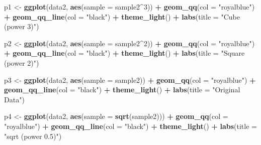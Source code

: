 \documentclass[
]{book}
\newenvironment{Shaded}{\begin{snugshade}}{\end{snugshade}}
\newcommand{\DataTypeTok}[1]{\textcolor[rgb]{0.13,0.29,0.53}{#1}}
\newcommand{\DecValTok}[1]{\textcolor[rgb]{0.00,0.00,0.81}{#1}}
\newcommand{\KeywordTok}[1]{\textcolor[rgb]{0.13,0.29,0.53}{\textbf{#1}}}
\newcommand{\NormalTok}[1]{#1}
\newcommand{\OperatorTok}[1]{\textcolor[rgb]{0.81,0.36,0.00}{\textbf{#1}}}
\newcommand{\StringTok}[1]{\textcolor[rgb]{0.31,0.60,0.02}{#1}}
\begin{document}
\begin{Shaded}
\begin{Highlighting}[]
\NormalTok{p1 <-}\StringTok{ }\KeywordTok{ggplot}\NormalTok{(data2, }\KeywordTok{aes}\NormalTok{(}\DataTypeTok{sample =}\NormalTok{ sample2}\OperatorTok{^}\DecValTok{3}\NormalTok{)) }\OperatorTok{+}
\StringTok{    }\KeywordTok{geom_qq}\NormalTok{(}\DataTypeTok{col =} \StringTok{"royalblue"}\NormalTok{) }\OperatorTok{+}\StringTok{ }
\StringTok{    }\KeywordTok{geom_qq_line}\NormalTok{(}\DataTypeTok{col =} \StringTok{"black"}\NormalTok{) }\OperatorTok{+}
\StringTok{    }\KeywordTok{theme_light}\NormalTok{() }\OperatorTok{+}
\StringTok{    }\KeywordTok{labs}\NormalTok{(}\DataTypeTok{title =} \StringTok{"Cube (power 3)"}\NormalTok{)}

\NormalTok{p2 <-}\StringTok{ }\KeywordTok{ggplot}\NormalTok{(data2, }\KeywordTok{aes}\NormalTok{(}\DataTypeTok{sample =}\NormalTok{ sample2}\OperatorTok{^}\DecValTok{2}\NormalTok{)) }\OperatorTok{+}
\StringTok{    }\KeywordTok{geom_qq}\NormalTok{(}\DataTypeTok{col =} \StringTok{"royalblue"}\NormalTok{) }\OperatorTok{+}\StringTok{ }
\StringTok{    }\KeywordTok{geom_qq_line}\NormalTok{(}\DataTypeTok{col =} \StringTok{"black"}\NormalTok{) }\OperatorTok{+}
\StringTok{    }\KeywordTok{theme_light}\NormalTok{() }\OperatorTok{+}
\StringTok{    }\KeywordTok{labs}\NormalTok{(}\DataTypeTok{title =} \StringTok{"Square (power 2)"}\NormalTok{)}

\NormalTok{p3 <-}\StringTok{ }\KeywordTok{ggplot}\NormalTok{(data2, }\KeywordTok{aes}\NormalTok{(}\DataTypeTok{sample =}\NormalTok{ sample2)) }\OperatorTok{+}
\StringTok{    }\KeywordTok{geom_qq}\NormalTok{(}\DataTypeTok{col =} \StringTok{"royalblue"}\NormalTok{) }\OperatorTok{+}\StringTok{ }
\StringTok{    }\KeywordTok{geom_qq_line}\NormalTok{(}\DataTypeTok{col =} \StringTok{"black"}\NormalTok{) }\OperatorTok{+}
\StringTok{    }\KeywordTok{theme_light}\NormalTok{() }\OperatorTok{+}
\StringTok{    }\KeywordTok{labs}\NormalTok{(}\DataTypeTok{title =} \StringTok{"Original Data"}\NormalTok{)}

\NormalTok{p4 <-}\StringTok{ }\KeywordTok{ggplot}\NormalTok{(data2, }\KeywordTok{aes}\NormalTok{(}\DataTypeTok{sample =} \KeywordTok{sqrt}\NormalTok{(sample2))) }\OperatorTok{+}
\StringTok{    }\KeywordTok{geom_qq}\NormalTok{(}\DataTypeTok{col =} \StringTok{"royalblue"}\NormalTok{) }\OperatorTok{+}\StringTok{ }
\StringTok{    }\KeywordTok{geom_qq_line}\NormalTok{(}\DataTypeTok{col =} \StringTok{"black"}\NormalTok{) }\OperatorTok{+}
\StringTok{    }\KeywordTok{theme_light}\NormalTok{() }\OperatorTok{+}
\StringTok{    }\KeywordTok{labs}\NormalTok{(}\DataTypeTok{title =} \StringTok{"sqrt (power 0.5)"}\NormalTok{)}


\end{Highlighting}
\end{Shaded}
\end{document}
